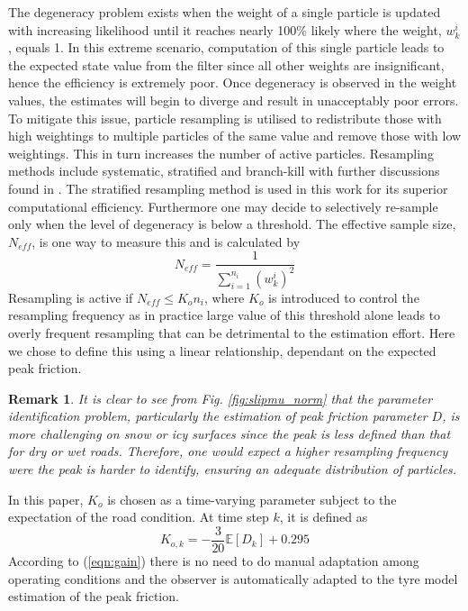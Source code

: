 \documentclass[onecolumn,journal,draftclsnofoot]{IEEEtran}
\newtheorem{remark}{Remark}
\begin{document}
The degeneracy problem exists when the weight of a single particle is updated with increasing likelihood until it reaches nearly 100\% likely where the weight, \(w_k^i\), equals 1. In this extreme scenario, computation of this single particle leads to the expected state value from the filter since all other weights are insignificant, hence the efficiency is extremely poor. 
Once degeneracy is observed in the weight values, the estimates will begin to diverge and result in unacceptably poor errors. 
To mitigate this issue, particle resampling is utilised to redistribute those with high weightings to multiple particles of the same value and remove those with low weightings. This in turn increases the number of active particles. 
Resampling methods include systematic, stratified and branch-kill with further discussions found in \cite{Li2015}.
The stratified resampling method is used in this work for its superior computational efficiency. Furthermore one may decide to selectively re-sample only when the level of degeneracy is below a threshold. The effective sample size, \(N_{eff}\), is one way to measure this \cite{Li2014} and is calculated by
\begin{equation}\label{eqn:neff}
    {N}_{eff} = \frac{1}{\sum_{i=1}^{n_i}\left(w_k^i\right)^2}
\end{equation}
Resampling is active if \(N_{eff} \leq K_o n_i \), where \(K_o\) is introduced to control the resampling frequency as in practice large value of this threshold alone leads to overly frequent resampling that can be detrimental to the estimation effort. Here we chose to define this using a linear relationship, dependant on the expected peak friction.


\begin{remark}
It is clear to see from Fig. \ref{fig:slipmu_norm} that the parameter identification problem, particularly the estimation of peak friction parameter \(D\), is more challenging on snow or icy surfaces since the peak is less defined than that for dry or wet roads. 
Therefore, one would expect a higher resampling frequency were the peak is harder to identify, ensuring an adequate distribution of particles.
\end{remark}
In this paper, $K_o$ is chosen as a time-varying parameter subject to the expectation of the road condition. 
At time step $k$, it is defined as
\begin{equation}\label{eqn:gain}
    K_{o,k} = -\frac{3}{20} \mathbb{E}\left[ D_k\right] + 0.295
\end{equation}
According to (\ref{eqn:gain}) there is no need to do manual adaptation among operating conditions and the observer is automatically adapted to the tyre model estimation of the peak friction.
\end{document}

